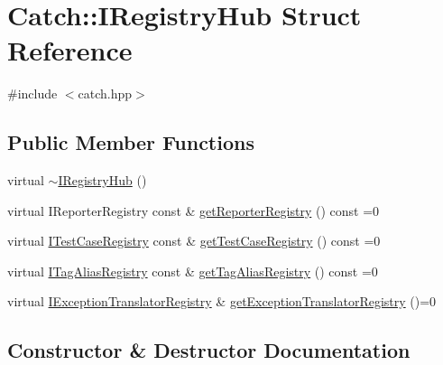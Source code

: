 \hypertarget{struct_catch_1_1_i_registry_hub}{}\section{Catch\+:\+:I\+Registry\+Hub Struct Reference}
\label{struct_catch_1_1_i_registry_hub}


{\ttfamily \#include $<$catch.\+hpp$>$}

\subsection*{Public Member Functions}
\begin{DoxyCompactItemize}
\item 
virtual \hyperlink{struct_catch_1_1_i_registry_hub_a050de0f27f96888c8b410992146c9a09}{$\sim$\+I\+Registry\+Hub} ()
\item 
virtual I\+Reporter\+Registry const  \& \hyperlink{struct_catch_1_1_i_registry_hub_a55534563f7ecf7e20ec1e37285ebe54d}{get\+Reporter\+Registry} () const =0
\item 
virtual \hyperlink{struct_catch_1_1_i_test_case_registry}{I\+Test\+Case\+Registry} const  \& \hyperlink{struct_catch_1_1_i_registry_hub_af4f6255f0c0f8f1f179fa9d7d4843076}{get\+Test\+Case\+Registry} () const =0
\item 
virtual \hyperlink{struct_catch_1_1_i_tag_alias_registry}{I\+Tag\+Alias\+Registry} const  \& \hyperlink{struct_catch_1_1_i_registry_hub_a3c511b1d33e5a6d95c333a0ff387df1a}{get\+Tag\+Alias\+Registry} () const =0
\item 
virtual \hyperlink{struct_catch_1_1_i_exception_translator_registry}{I\+Exception\+Translator\+Registry} \& \hyperlink{struct_catch_1_1_i_registry_hub_a3606988da110c016c5af3ae63454eb78}{get\+Exception\+Translator\+Registry} ()=0
\end{DoxyCompactItemize}


\subsection{Constructor \& Destructor Documentation}
\mbox{\label{struct_catch_1_1_i_registry_hub_a050de0f27f96888c8b410992146c9a09}} 
